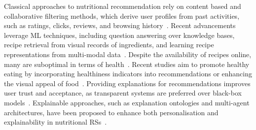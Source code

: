 Classical approaches to nutritional recommendation rely on content based and collaborative filtering methods, which derive user profiles from past activities, such as ratings, clicks, reviews, and browsing history~\cite{Min2020}.
%
Recent advancements leverage \gls{ML} techniques, including question answering over knowledge bases, recipe retrieval from visual records of ingredients, and learning recipe representations from multi-modal data~\cite{Forbes2011,Bianchini2017,Freyne2010,Chen2021,Tian2022}.
%
Despite the availability of recipes online, many are suboptimal in terms of health~\cite{Trattner2017a}.
%
Recent studies aim to promote healthy eating by incorporating healthiness indicators into recommendations or enhancing the visual appeal of food~\cite{Saiz2021,10.1145/3418211}.
%
Providing explanations for recommendations improves user trust and acceptance, as transparent systems are preferred over black-box models~\cite{Anjomshoae2019}.
%
Explainable approaches, such as explanation ontologies and multi-agent architectures, have been proposed to enhance both personalisation and explainability in nutritional \glspl{RS}~\cite{DBLP:conf/icde/PadhiarSCGM21,Yera2022,expectation-extraamas2021}.

